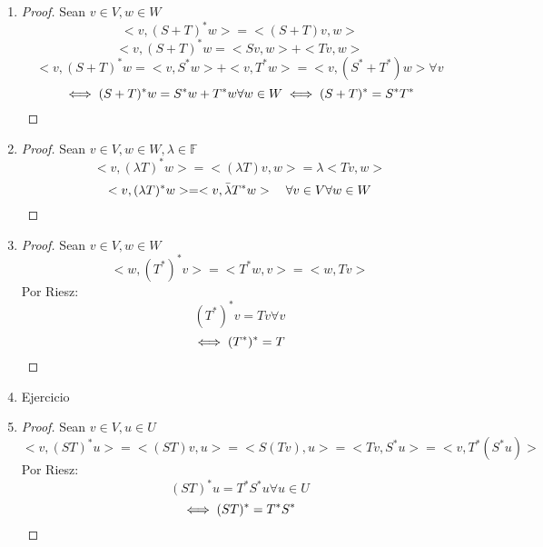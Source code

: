 \documentclass[11pt]{book}
\newcommand{\set}[1]{\mathbb{#1}}
\theoremstyle{definition}
\begin{document}
\begin{enumerate}[label=\alph*)]
	\item \begin{proof}
		Sean $v\in V,w\in W$
		\[<v,(S+T)^*w>=<(S+T)v,w>\]
		\[<v,(S+T)^*w=<Sv,w>+<Tv,w>\]
		\[<v,(S+T)^*w=<v,S^*w>+<v,T^*w>=<v,(S^*+T^*)w>\forall v\]
		\[\iff (S+T)^*w=S^*w+T^*w\forall w\in W\iff (S+T)^*=S^*T^*\qedhere\]
	\end{proof}

	\item \begin{proof}
		Sean $v\in V,w\in W,\lambda\in\set{F}$
		\[<v,(\lambda T)^*w>=<(\lambda T)v,w>=\lambda<Tv,w>\]
		\[<v,(\lambda T)^*w>=<v,\bar{\lambda}T^*w>\quad\forall v\in V\forall w\in W\qedhere\]
	\end{proof}
	
	\item \begin{proof}
		Sean $v\in V,w\in W$
		\[<w,(T^*)^*v>=<T^*w,v>=<w,Tv>\]
		Por Riesz:
		\[(T^*)^*v=Tv\forall v\]
		\[\iff (T^*)^*=T\qedhere\]
	\end{proof}

	\item Ejercicio

	\item \begin{proof}
		Sean $v\in V, u\in U$
		\[<v,(ST)^*u>=<(ST)v,u>=<S(Tv),u>=<Tv,S^*u>=<v,T^*(S^*u)>\]
		Por Riesz:
		\[(ST)^*u=T^*S^*u\forall u\in U\]
		\[\iff (ST)^*=T^*S^*\qedhere\]
	\end{proof}
\end{enumerate}
\end{document}
